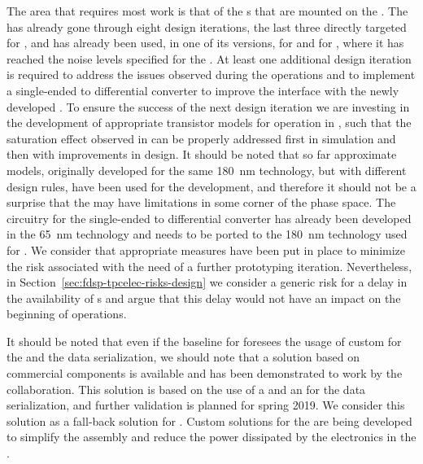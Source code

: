 The area that requires most work is that of the s that are mounted
on the . The   has already gone through eight design
iterations, the last three directly targeted for , and has already been used, 
in one of its versions, for  and for , where it has reached the 
noise levels specified for the  . At least one additional design iteration is
required to address the issues observed during the  operations and
to implement a single-ended to differential converter to improve the interface
with the newly developed . To ensure the success of the next 
design iteration we are investing in the development of appropriate transistor
models for operation in \lar, such that the saturation effect observed in 
 can be properly addressed first in simulation and then with improvements 
in design. It should be noted that so far approximate models, originally developed for 
the same \SI{180}{nm} technology, but with different design rules, have been used for 
the  development, and therefore it should not be a surprise
that the   may have limitations in some corner of the phase space.
The circuitry for the single-ended to differential converter has already been 
developed in the \SI{65}{nm} technology and needs to be ported to the \SI{180}{nm}
technology used for . We consider that appropriate measures have been
put in place to minimize the risk associated with the need of a further
prototyping iteration. Nevertheless, in Section~\ref{sec:fdsp-tpcelec-risks-design}
we consider a generic risk for a delay in the availability of s and
argue that this delay would not have an impact on the beginning of  operations.

It should be noted that even if the baseline for  foresees the usage
of custom  for the  and the data serialization, we should
note that a solution based on commercial components is available and has been 
demonstrated to work by the  collaboration. This solution is based on
the use of a   and an  for the data serialization,
and further validation is planned for spring 2019. We consider this solution as
a fall-back solution for . Custom solutions for the  are 
being developed to simplify the  assembly and reduce the power dissipated by the
electronics in the \lar.

